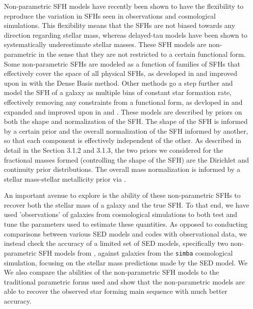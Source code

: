 \documentclass[twocolumn]{aastex62}
\begin{document}
Non-parametric SFH models have recently been shown to have the flexibility to reproduce the variation in SFHs seen in observations and cosmological simulations. This flexibility means that the SFHs are not biased towards any direction regarding stellar mass, whereas delayed-tau models have been shown to systematically underestimate stellar masses. These SFH models are non-parametric in the sense that they are not restricted to a certain functional form. Some non-parametric SFHs are modeled as a function of families of SFHs that effectively cover the space of all physical SFHs, as developed in \cite{iyer_reconstruction_2017} and improved upon in \cite{iyer_non-parametric_2019} with the Dense Basis method. Other methods go a step further and model the SFH of a galaxy as multiple bins of constant star formation rate, effectively removing any constraints from a functional form, as devloped in \cite{leja_deriving_2017} and expanded and improved upon in \cite{leja_how_2018} and \cite{leja_older_2019}. These models are described by priors on both the shape and normalization of the SFH. The shape of the SFH is informed by a certain prior and the overall normalization of the SFH informed by another, so that each component is effectively independent of the other. As described in detail in the Section  3.1.2 and 3.1.3, the two priors we considered for the fractional masses formed (controlling the shape of the SFH) are the Dirichlet and continuity prior distributions. The overall mass normalization is informed by a stellar mass-stellar metallicity prior via \cite{gallazzi_ages_2005}.   

An important avenue to explore is the ability of these non-parametric SFHs to recover both the stellar mass of a galaxy and the true SFH. To that end, we have used 'observations' of galaxies from cosmological simulations to both test and tune the parameters used to estimate these quantities. As opposed to conducting comparisons between various SED models and codes with observational data, we instead check the accuracy of a limited set of SED models, specifically two non-parametric SFH models from \cite{leja_how_2018}, against galaxies from the \texttt{simba} cosmological simulation, focusing on the stellar mass predictions made by the SED model. We We also compare the abilities of the non-parametric SFH models to the traditional parametric forms used and show that the non-parametric models are able to recover the observed star forming main sequence with much better accuracy.  
\end{document}
